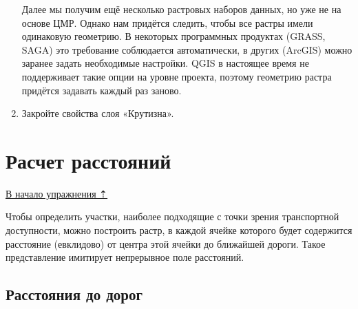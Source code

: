 \documentclass[
  12pt,
]{book}
\begin{document}
\begin{enumerate}
  Далее мы получим ещё несколько растровых наборов данных, но уже не на основе ЦМР. Однако нам придётся следить, чтобы все растры имели одинаковую геометрию. В некоторых программных продуктах (GRASS, SAGA) это требование соблюдается автоматически, в других (ArcGIS) можно заранее задать необходимые настройки. QGIS в настоящее время не поддерживает такие опции на уровне проекта, поэтому геометрию растра придётся задавать каждый раз заново.
\item
  Закройте свойства слоя «Крутизна».
\end{enumerate}

\hypertarget{weighted-overlay-distances}{%
\section{Расчет расстояний}\label{weighted-overlay-distances}}

\protect\hyperlink{weighted-overlay}{В начало упражнения ⇡}

Чтобы определить участки, наиболее подходящие с точки зрения транспортной доступности, можно построить растр, в каждой ячейке которого будет содержится расстояние (евклидово) от центра этой ячейки до ближайшей дороги. Такое представление имитирует непрерывное поле расстояний.

\hypertarget{weighted-overlay-roads}{%
\subsection{Расстояния до дорог}\label{weighted-overlay-roads}}
\end{document}
